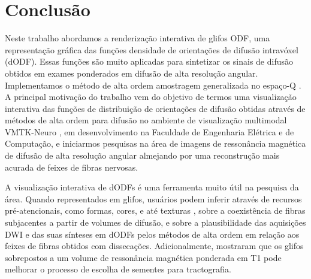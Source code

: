 \documentclass[
    12pt,                %
    oneside,            %
    a4paper,            %
    english,            %
    french,                %
    spanish,            %
    brazil                %
    ]{abntex2}
\begin{document}


%
%


%
%


\chapter{Conclusão}
\label{chap::conclusao}


Neste trabalho abordamos a renderização interativa de glifos ODF, uma representação gráfica das funções densidade de orientações de difusão intravóxel (dODF). Essas funções são muito aplicadas para sintetizar os sinais de difusão obtidos em exames ponderados em difusão de alta resolução angular. Implementamos o método de alta ordem amostragem generalizada no espaço-Q \cite{yeh2010}. A principal motivação do trabalho vem do objetivo de termos uma visualização interativa das funções de distribuição de orientações de difusão obtidas através de métodos de alta ordem para difusão no ambiente de visualização multimodal VMTK-Neuro \cite{VMTKNeuro}, em desenvolvimento na Faculdade de Engenharia Elétrica e de Computação, e iniciarmos pesquisas na área de imagens de ressonância magnética de difusão de alta resolução angular almejando por uma reconstrução mais acurada de feixes de fibras nervosas.

A visualização interativa de dODFs é uma ferramenta muito útil na pesquisa da área. Quando representados em glifos, usuários podem inferir através de recursos pré-atencionais, como formas, cores, e até texturas \cite{ware2004}, sobre a coexistência de fibras subjacentes a partir de volumes de difusão, e sobre a plausibilidade das aquisições DWI e das suas sínteses em dODFs pelos métodos de alta ordem em relação aos feixes de fibras obtidos com dissecações. Adicionalmente,  mostraram que os glifos sobrepostos a um volume de ressonância magnética ponderada em T1 pode melhorar o processo de escolha de sementes para tractografia.
\end{document}
